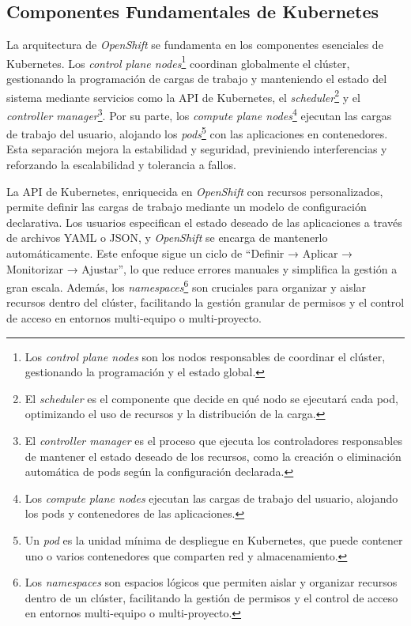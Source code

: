 \subsection{Componentes Fundamentales de Kubernetes}
La arquitectura de \textit{OpenShift} se fundamenta en los componentes esenciales de Kubernetes. Los \textit{control plane nodes}\footnote{Los \textit{control plane nodes} son los nodos responsables de coordinar el clúster, gestionando la programación y el estado global.} coordinan globalmente el clúster, gestionando la programación de cargas de trabajo y manteniendo el estado del sistema mediante servicios como la API de Kubernetes, el \textit{scheduler}\footnote{El \textit{scheduler} es el componente que decide en qué nodo se ejecutará cada pod, optimizando el uso de recursos y la distribución de la carga.} y el \textit{controller manager}\footnote{El \textit{controller manager} es el proceso que ejecuta los controladores responsables de mantener el estado deseado de los recursos, como la creación o eliminación automática de pods según la configuración declarada.}. Por su parte, los \textit{compute plane nodes}\footnote{Los \textit{compute plane nodes} ejecutan las cargas de trabajo del usuario, alojando los pods y contenedores de las aplicaciones.} ejecutan las cargas de trabajo del usuario, alojando los \textit{pods}\footnote{Un \textit{pod} es la unidad mínima de despliegue en Kubernetes, que puede contener uno o varios contenedores que comparten red y almacenamiento.} con las aplicaciones en contenedores. Esta separación mejora la estabilidad y seguridad, previniendo interferencias y reforzando la escalabilidad y tolerancia a fallos.

La API de Kubernetes, enriquecida en \textit{OpenShift} con recursos personalizados, permite definir las cargas de trabajo mediante un modelo de configuración declarativa. Los usuarios especifican el estado deseado de las aplicaciones a través de archivos YAML o JSON, y \textit{OpenShift} se encarga de mantenerlo automáticamente. Este enfoque sigue un ciclo de “Definir → Aplicar → Monitorizar → Ajustar”, lo que reduce errores manuales y simplifica la gestión a gran escala. Además, los \textit{namespaces}\footnote{Los \textit{namespaces} son espacios lógicos que permiten aislar y organizar recursos dentro de un clúster, facilitando la gestión de permisos y el control de acceso en entornos multi-equipo o multi-proyecto.} son cruciales para organizar y aislar recursos dentro del clúster, facilitando la gestión granular de permisos y el control de acceso en entornos multi-equipo o multi-proyecto.

